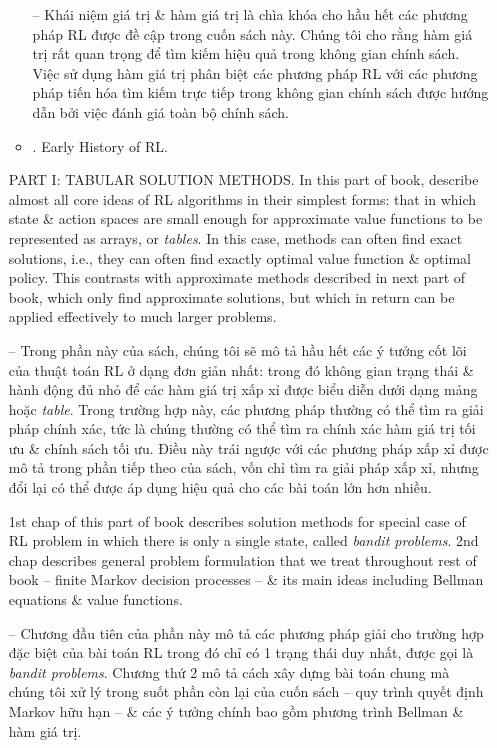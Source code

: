 \documentclass{article}
\begin{document}
\begin{itemize}
\begin{itemize}
        -- Khái niệm giá trị \& hàm giá trị là chìa khóa cho hầu hết các phương pháp RL được đề cập trong cuốn sách này. Chúng tôi cho rằng hàm giá trị rất quan trọng để tìm kiếm hiệu quả trong không gian chính sách. Việc sử dụng hàm giá trị phân biệt các phương pháp RL với các phương pháp tiến hóa tìm kiếm trực tiếp trong không gian chính sách được hướng dẫn bởi việc đánh giá toàn bộ chính sách.
        \item {. Early History of RL.}
    \end{itemize}

    PART I: TABULAR SOLUTION METHODS. In this part of book, describe almost all core ideas of RL algorithms in their simplest forms: that in which state \& action spaces are small enough for approximate value functions to be represented as arrays, or {\it tables}. In this case, methods can often find exact solutions, i.e., they can often find exactly optimal value function \& optimal policy. This contrasts with approximate methods described in next part of book, which only find approximate solutions, but which in return can be applied effectively to much larger problems.

    -- Trong phần này của sách, chúng tôi sẽ mô tả hầu hết các ý tưởng cốt lõi của thuật toán RL ở dạng đơn giản nhất: trong đó không gian trạng thái \& hành động đủ nhỏ để các hàm giá trị xấp xỉ được biểu diễn dưới dạng mảng hoặc {\it table}. Trong trường hợp này, các phương pháp thường có thể tìm ra giải pháp chính xác, tức là chúng thường có thể tìm ra chính xác hàm giá trị tối ưu \& chính sách tối ưu. Điều này trái ngược với các phương pháp xấp xỉ được mô tả trong phần tiếp theo của sách, vốn chỉ tìm ra giải pháp xấp xỉ, nhưng đổi lại có thể được áp dụng hiệu quả cho các bài toán lớn hơn nhiều.

    1st chap of this part of book describes solution methods for special case of RL problem in which there is only a single state, called {\it bandit problems}. 2nd chap describes general problem formulation that we treat throughout rest of book -- finite Markov decision processes -- \& its main ideas including Bellman equations \& value functions.

    -- Chương đầu tiên của phần này mô tả các phương pháp giải cho trường hợp đặc biệt của bài toán RL trong đó chỉ có 1 trạng thái duy nhất, được gọi là {\it bandit problems}. Chương thứ 2 mô tả cách xây dựng bài toán chung mà chúng tôi xử lý trong suốt phần còn lại của cuốn sách -- quy trình quyết định Markov hữu hạn -- \& các ý tưởng chính bao gồm phương trình Bellman \& hàm giá trị.


\end{itemize}
\end{document}
